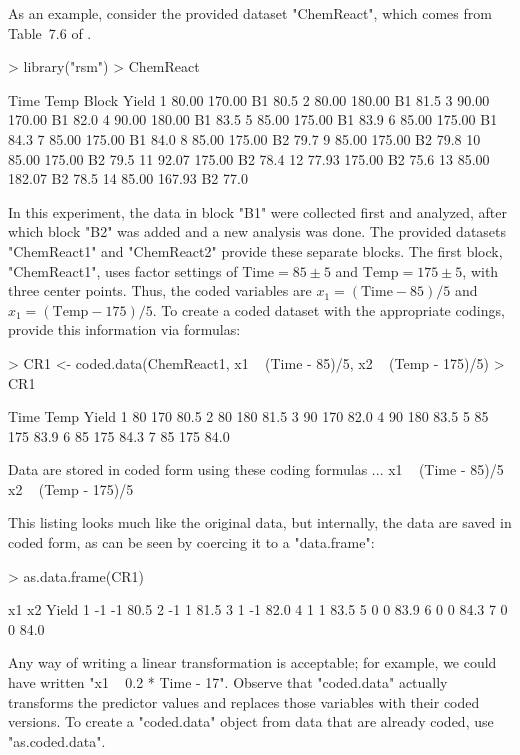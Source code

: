\documentclass[article,nojss]{jss}
\begin{document}
As an example, consider the provided dataset "ChemReact", which comes from Table~7.6 of \cite{Mye09}.
\begin{Schunk}
\begin{Sinput}
> library("rsm")
> ChemReact
\end{Sinput}
\begin{Soutput}
    Time   Temp Block Yield
1  80.00 170.00    B1  80.5
2  80.00 180.00    B1  81.5
3  90.00 170.00    B1  82.0
4  90.00 180.00    B1  83.5
5  85.00 175.00    B1  83.9
6  85.00 175.00    B1  84.3
7  85.00 175.00    B1  84.0
8  85.00 175.00    B2  79.7
9  85.00 175.00    B2  79.8
10 85.00 175.00    B2  79.5
11 92.07 175.00    B2  78.4
12 77.93 175.00    B2  75.6
13 85.00 182.07    B2  78.5
14 85.00 167.93    B2  77.0
\end{Soutput}
\end{Schunk}
In this experiment, the data in block "B1" were collected first and analyzed, after which block "B2" was added and a new analysis was done. The provided datasets "ChemReact1" and "ChemReact2" provide these separate blocks. 
The first block, "ChemReact1", uses factor settings of $\text{Time}=85\pm5$ and $\text{Temp}=175\pm5$, with three center points.  Thus, the coded variables are $x_1 = (\text{Time}-85)/5$ and $x_1 = (\text{Temp}-175)/5$.  To create a coded dataset with the appropriate codings, provide this information via formulas:
\begin{Schunk}
\begin{Sinput}
> CR1 <- coded.data(ChemReact1, x1 ~ (Time - 85)/5, x2 ~ (Temp - 175)/5)
> CR1
\end{Sinput}
\begin{Soutput}
  Time Temp Yield
1   80  170  80.5
2   80  180  81.5
3   90  170  82.0
4   90  180  83.5
5   85  175  83.9
6   85  175  84.3
7   85  175  84.0

Data are stored in coded form using these coding formulas ...
x1 ~ (Time - 85)/5
x2 ~ (Temp - 175)/5
\end{Soutput}
\end{Schunk}
This listing looks much like the original data, but internally, the data are saved in coded form, as can be seen by coercing it to a "data.frame":
\begin{Schunk}
\begin{Sinput}
> as.data.frame(CR1)
\end{Sinput}
\begin{Soutput}
  x1 x2 Yield
1 -1 -1  80.5
2 -1  1  81.5
3  1 -1  82.0
4  1  1  83.5
5  0  0  83.9
6  0  0  84.3
7  0  0  84.0
\end{Soutput}
\end{Schunk}
Any way of writing a linear transformation is acceptable; for example, we could have written "x1 ~ 0.2 * Time - 17".
Observe that "coded.data" actually transforms the predictor values and replaces those variables with their coded versions.  To create a "coded.data" object from data that are already coded, use "as.coded.data".
\end{document}
